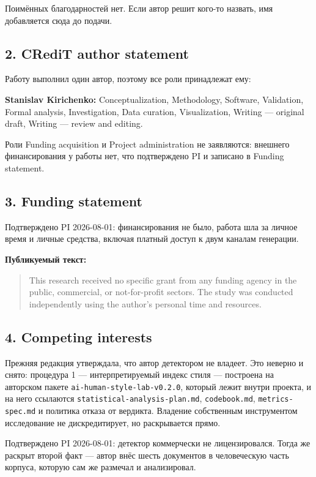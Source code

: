 \documentclass[11pt,a4paper]{article}
\renewcommand{\_}{\textunderscore\allowbreak}
\begin{document}
Поимённых благодарностей нет. Если автор решит кого-то назвать, имя добавляется
сюда до подачи.

\subsection{2. CRediT author statement}

Работу выполнил один автор, поэтому все роли принадлежат ему:

\textbf{Stanislav Kirichenko:} Conceptualization, Methodology, Software, Validation,
Formal analysis, Investigation, Data curation, Visualization, Writing — original
draft, Writing — review and editing.

Роли Funding acquisition и Project administration не заявляются: внешнего
финансирования у работы нет, что подтверждено PI и записано в Funding statement.

\subsection{3. Funding statement}

Подтверждено PI 2026-08-01: финансирования не было, работа шла за личное время и
личные средства, включая платный доступ к двум каналам генерации.

\textbf{Публикуемый текст:}

\begin{quote}
This research received no specific grant from any funding agency in the public,
commercial, or not-for-profit sectors. The study was conducted independently using
the author's personal time and resources.
\end{quote}

\subsection{4. Competing interests}

Прежняя редакция утверждала, что автор детектором не владеет. Это неверно и снято:
процедура 1 — интерпретируемый индекс стиля — построена на авторском пакете
\texttt{ai-\allowbreak{}human-\allowbreak{}style-\allowbreak{}lab-\allowbreak{}v0.2.0}, который лежит внутри проекта, и на него ссылаются
\texttt{statistical-\allowbreak{}analysis-\allowbreak{}plan.md}, \texttt{codebook.md}, \texttt{metrics-\allowbreak{}spec.md} и политика отказа
от вердикта. Владение собственным инструментом исследование не дискредитирует, но
раскрывается прямо.

Подтверждено PI 2026-08-01: детектор коммерчески не лицензировался. Тогда же
раскрыт второй факт — автор внёс шесть документов в человеческую часть корпуса,
которую сам же размечал и анализировал.
\end{document}

